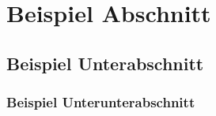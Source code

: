 \section{Beispiel Abschnitt}

\subsection{Beispiel Unterabschnitt}

\subsubsection{Beispiel Unterunterabschnitt}

\Blindtext{}
